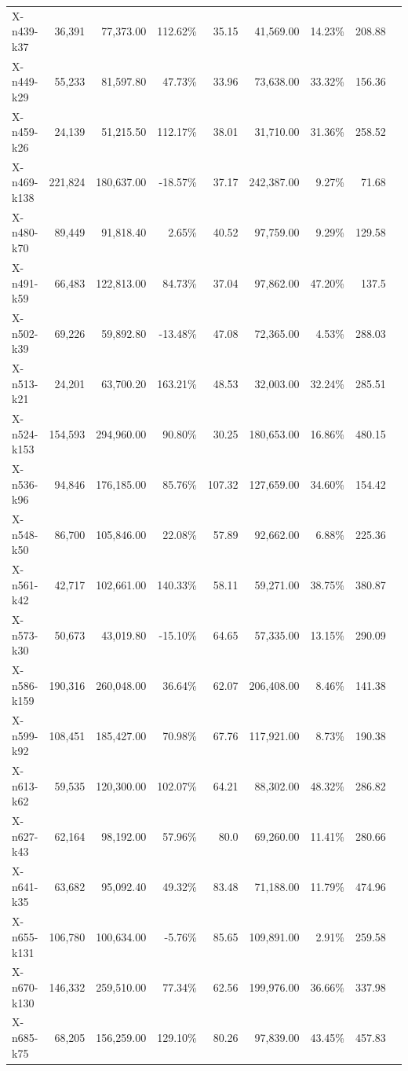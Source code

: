 \documentclass[12pt,a4paper]{article}
\begin{document}
\begin{longtable}{@{}lrrrrrrrr@{}}
    X-n439-k37 & 36,391 & 77,373.00 & 112.62\% & 35.15 & 41,569.00 & 14.23\% & 208.88 \\
    X-n449-k29 & 55,233 & 81,597.80 & 47.73\% & 33.96 & 73,638.00 & 33.32\% & 156.36 \\
    X-n459-k26 & 24,139 & 51,215.50 & 112.17\% & 38.01 & 31,710.00 & 31.36\% & 258.52 \\
    X-n469-k138 & 221,824 & 180,637.00 & -18.57\% & 37.17 & 242,387.00 & 9.27\% & 71.68 \\
    X-n480-k70 & 89,449 & 91,818.40 & 2.65\% & 40.52 & 97,759.00 & 9.29\% & 129.58 \\
    X-n491-k59 & 66,483 & 122,813.00 & 84.73\% & 37.04 & 97,862.00 & 47.20\% & 137.5 \\
    X-n502-k39 & 69,226 & 59,892.80 & -13.48\% & 47.08 & 72,365.00 & 4.53\% & 288.03 \\
    X-n513-k21 & 24,201 & 63,700.20 & 163.21\% & 48.53 & 32,003.00 & 32.24\% & 285.51 \\
    X-n524-k153 & 154,593 & 294,960.00 & 90.80\% & 30.25 & 180,653.00 & 16.86\% & 480.15 \\
    X-n536-k96 & 94,846 & 176,185.00 & 85.76\% & 107.32 & 127,659.00 & 34.60\% & 154.42 \\
    X-n548-k50 & 86,700 & 105,846.00 & 22.08\% & 57.89 & 92,662.00 & 6.88\% & 225.36 \\
    X-n561-k42 & 42,717 & 102,661.00 & 140.33\% & 58.11 & 59,271.00 & 38.75\% & 380.87 \\
    X-n573-k30 & 50,673 & 43,019.80 & -15.10\% & 64.65 & 57,335.00 & 13.15\% & 290.09 \\
    X-n586-k159 & 190,316 & 260,048.00 & 36.64\% & 62.07 & 206,408.00 & 8.46\% & 141.38 \\
    X-n599-k92 & 108,451 & 185,427.00 & 70.98\% & 67.76 & 117,921.00 & 8.73\% & 190.38 \\
    X-n613-k62 & 59,535 & 120,300.00 & 102.07\% & 64.21 & 88,302.00 & 48.32\% & 286.82 \\
    X-n627-k43 & 62,164 & 98,192.00 & 57.96\% & 80.0 & 69,260.00 & 11.41\% & 280.66 \\
    X-n641-k35 & 63,682 & 95,092.40 & 49.32\% & 83.48 & 71,188.00 & 11.79\% & 474.96 \\
    X-n655-k131 & 106,780 & 100,634.00 & -5.76\% & 85.65 & 109,891.00 & 2.91\% & 259.58 \\
    X-n670-k130 & 146,332 & 259,510.00 & 77.34\% & 62.56 & 199,976.00 & 36.66\% & 337.98 \\
    X-n685-k75 & 68,205 & 156,259.00 & 129.10\% & 80.26 & 97,839.00 & 43.45\% & 457.83 \\

\end{longtable}
\end{document}
